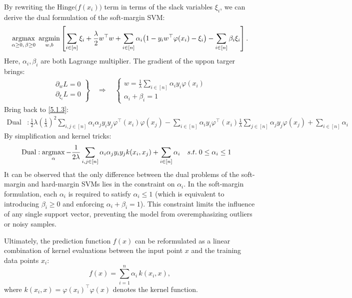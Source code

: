 \documentclass[../main]{subfiles}
\begin{document}
By rewriting the $\mathrm{Hinge}\bigl(f(x_i)\bigr)$ term in terms of the slack variables $\xi_i$,  
we can derive the dual formulation of the soft-margin SVM:
\begin{equation}
    \mathop{\mathrm{argmax}}_{\alpha \ge 0,\, \beta \ge 0}\;
    \mathop{\mathrm{argmin}}_{w,b}
    \left[
        \sum_{i \in [n]} \xi_i
        + \frac{\lambda}{2} w^\top w
        + \sum_{i \in [n]} \alpha_i\bigl(1 - y_i w^\top \varphi(x_i) - \xi_i\bigr)
        - \sum_{i \in [n]} \beta_i \xi_i
    \right].
    \label{5.1.3}
\end{equation}
Here, $\alpha_i,\beta_i$ are both Lagrange multiplier. The gradient of the uppon targer brings:
\begin{gather}\left.
    \begin{matrix}
        \partial_w L=0\\
        \partial_{\xi_i} L=0
    \end{matrix}\right\}\quad \Rightarrow\quad\begin{cases}
        \displaystyle w=\frac{1}{\lambda}\sum_{i\in [n]}\alpha_i y_i\varphi(x_i)\\
        \alpha_i+\beta_i=1
    \end{cases}
\end{gather} 
Bring back to \eqref{5.1.3}:
\begin{align}
    \mathrm{Dual}&:\frac{1}{2}\lambda\left(\frac{1}{\lambda}\right)^2\sum_{i,j\in[n]}\alpha_i\alpha_jy_iy_j\varphi^\top(x_i)\varphi(x_j)-\sum_{i\in[n]}\alpha_iy_i\varphi^\top(x_i)\frac{1}{\lambda}\sum_{j\in[n]}\alpha_jy_j\varphi(x_j)+\sum_{i\in[n]}\alpha_i
\end{align}
By simplification and kernel tricks:
\begin{align}
    \mathrm{Dual}&:\mathop{\mathrm{argmax}}_{\alpha}-\frac{1}{2\lambda}\sum_{i,j\in[n]}\alpha_i\alpha_jy_iy_jk(x_i,x_j)+\sum_{i\in[n]}\alpha_i\quad s.t.\; 0\le\alpha_i\le 1
\end{align}
It can be observed that the only difference between the dual problems of the soft-margin and hard-margin SVMs lies in the constraint on $\alpha_i$.  
In the soft-margin formulation, each $\alpha_i$ is required to satisfy $\alpha_i \le 1$  
(which is equivalent to introducing $\beta_i \ge 0$ and enforcing $\alpha_i + \beta_i = 1$).  
This constraint limits the influence of any single support vector, preventing the model from overemphasizing outliers or noisy samples.

Ultimately, the prediction function $f(x)$ can be reformulated as a linear combination of kernel evaluations between the input point $x$ and the training data points $x_i$:
\begin{equation}
    f(x) = \sum_{i=1}^{n} \alpha_i\, k(x_i, x),
\end{equation}
where $k(x_i, x) = \varphi(x_i)^\top \varphi(x)$ denotes the kernel function.
\vspace{1em}
\end{document}

